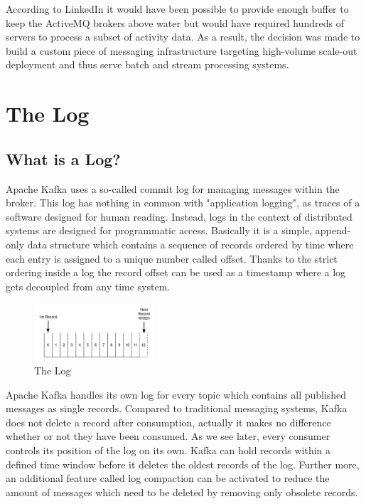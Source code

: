 According to LinkedIn it would have been possible to provide enough buffer to
keep the ActiveMQ brokers above water but would have required hundreds of servers to
process a subset of activity data. As a result, the decision was made to build a
custom piece of messaging infrastructure targeting high-volume scale-out
deployment and thus serve batch and stream processing systems. 
\cite{goodhope2012building}

\section{The Log}
\subsection{What is a Log?}
\label{intro-kafka-log}
Apache Kafka uses a so-called commit log for managing messages within the
broker. This log has nothing in common with "application logging", as traces of
a software designed for human reading. Instead, logs in the context of distributed systems
are designed for programmatic access. Basically it is a simple, append-only data
structure which contains a sequence of records ordered by time where each
entry is assigned to a unique number called offset. Thanks to the strict
ordering inside a log the record offset can be used as a timestamp where a log
gets decoupled from any time system. \cite{apachekafka} \cite{JK-TheLog}

\begin{figure}[H]
    \centering
    \includegraphics[width=0.4\textwidth]{images/log.png}
    \caption{The  Log \cite{JK-TheLog}}
    \label{fig:the-log}
\end{figure}

Apache Kafka handles its own log for every topic which contains all
published messages as single records. Compared to traditional messaging systems,
Kafka does not delete a record after consumption, actually it makes no difference
 whether or not they have been consumed. As we see later, every consumer
controls its position of the log on its own. Kafka can hold records within a
defined time window before it deletes the oldest records of the log.
Further more, an additional feature called log compaction can be activated to
reduce the amount of messages which need to be deleted by removing only obsolete
records. \cite{apachekafka} \cite{JK-TheLog}


